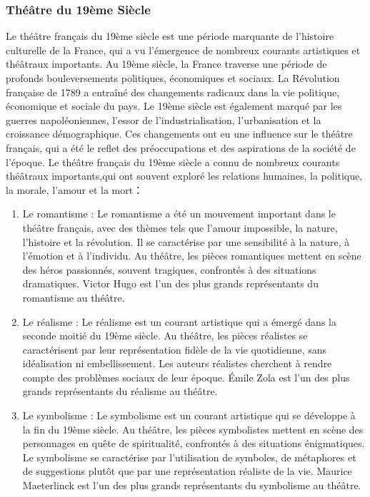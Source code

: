\documentclass[UTF8,a4paper,12pt]{ctexart}
\numberwithin{equation}{section}
\begin{document}
\subsubsection{Théâtre du 19ème Siècle}
Le théâtre français du 19ème siècle est une période marquante de l'histoire culturelle de la France, qui a vu l'émergence de nombreux courants artistiques et théâtraux importants. Au 19ème siècle, la France traverse une période de profonds bouleversements politiques, économiques et sociaux. La Révolution française de 1789 a entraîné des changements radicaux dans la vie politique, économique et sociale du pays. Le 19ème siècle est également marqué par les guerres napoléoniennes, l'essor de l'industrialisation, l'urbanisation et la croissance démographique. Ces changements ont eu une influence sur le théâtre français, qui a été le reflet des préoccupations et des aspirations de la société de l'époque.
Le théâtre français du 19ème siècle a connu de nombreux courants théâtraux importants,qui ont souvent exploré les relations humaines, la politique, la morale, l'amour et la mort：
\begin{enumerate}
\item Le romantisme : Le romantisme a été un mouvement important dans le théâtre français, avec des thèmes tels que l'amour impossible, la nature, l'histoire et la révolution. Il se caractérise par une sensibilité à la nature, à l'émotion et à l'individu. Au théâtre, les pièces romantiques mettent en scène des héros passionnés, souvent tragiques, confrontés à des situations dramatiques. Victor Hugo est l'un des plus grands représentants du romantisme au théâtre.

\item Le réalisme : Le réalisme est un courant artistique qui a émergé dans la seconde moitié du 19ème siècle. Au théâtre, les pièces réalistes se caractérisent par leur représentation fidèle de la vie quotidienne, sans idéalisation ni embellissement. Les auteurs réalistes cherchent à rendre compte des problèmes sociaux de leur époque. Émile Zola est l'un des plus grands représentants du réalisme au théâtre.

\item Le symbolisme : Le symbolisme est un courant artistique qui se développe à la fin du 19ème siècle. Au théâtre, les pièces symbolistes mettent en scène des personnages en quête de spiritualité, confrontés à des situations énigmatiques. Le symbolisme se caractérise par l'utilisation de symboles, de métaphores et de suggestions plutôt que par une représentation réaliste de la vie. Maurice Maeterlinck est l'un des plus grands représentants du symbolisme au théâtre.
\end{enumerate}
\end{document}
